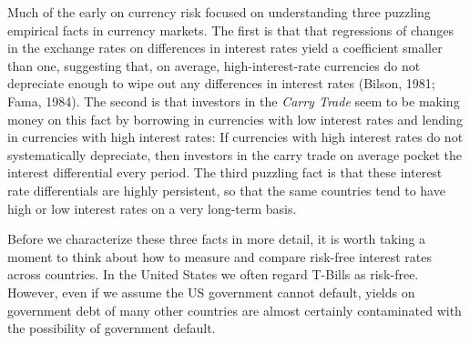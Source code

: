 \documentclass{ar-1col}
\begin{document}
Much of the early on currency risk focused on understanding three puzzling empirical facts in currency markets. The first is that that regressions of changes in the exchange rates on differences in interest rates yield a coefficient smaller than one, suggesting that, on average, high-interest-rate currencies do not depreciate enough to wipe out any differences in interest rates (Bilson, 1981; Fama, 1984). The second is that investors in the \textit{Carry Trade} seem to be making money on this fact by borrowing in currencies with low interest rates and lending in currencies with high interest rates: If currencies with high interest rates do not systematically depreciate, then investors in the carry trade on average pocket the interest differential every period. The third puzzling fact is that these interest rate differentials are highly persistent, so that the same countries tend to have high or low interest rates on a very long-term basis.

Before we characterize these three facts in more detail, it is worth taking a moment to think about how to measure and compare risk-free interest rates across countries. In the United States we often regard T-Bills as risk-free. However, even if we assume the US government cannot default, yields on government debt of many other countries are almost certainly contaminated with the possibility of government default.
\end{document}
